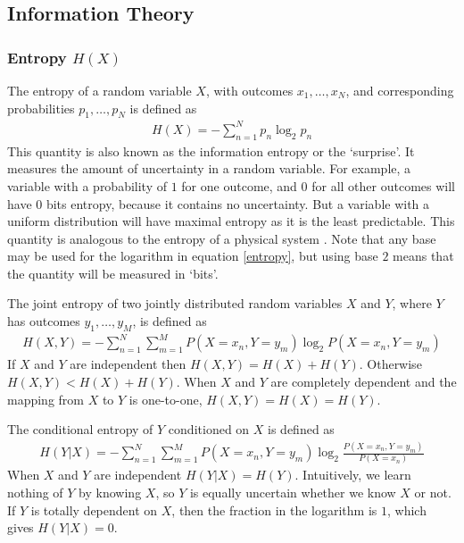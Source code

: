     \subsection{Information Theory}\label{sec:information_theory}
        \subsubsection{Entropy $H(X)$}
        The entropy of a random variable $X$, with outcomes $x_1, \dots, x_N$, and corresponding probabilities $p_1, \dots, p_N$ is defined as
        \begin{align}\label{entropy}
        H(X) = -\sum_{n=1}^N p_n \log _2 p_n
        \end{align}
        This quantity is also known as the information entropy or the `surprise'. It measures the amount of uncertainty in a random variable. For example, a variable with a probability of $1$ for one outcome, and $0$ for all other outcomes will have 0 bits entropy, because it contains no uncertainty. But a variable with a uniform distribution will have maximal entropy as it is the least predictable. This quantity is analogous to the entropy of a physical system  \parencite{shannon}. Note that any base may be used for the logarithm in equation \ref{entropy}, but using base $2$ means that the quantity will be measured in `bits'.

        The joint entropy of two jointly distributed random variables $X$ and $Y$, where $Y$ has outcomes $y_1, \dots, y_M$, is defined as
        \begin{align}\label{joint_entropy}
        H(X, Y) = -\sum_{n=1}^N \sum_{m=1}^M P(X=x_n, Y=y_m) \log _2 P(X=x_n, Y=y_m)
        \end{align}
        If $X$ and $Y$ are independent then $H(X,Y) = H(X) + H(Y)$. Otherwise $H(X,Y) < H(X) + H(Y)$. When $X$ and $Y$ are completely dependent and the mapping from $X$ to $Y$ is one-to-one, $H(X,Y) = H(X) = H(Y)$.

        The conditional entropy of $Y$ conditioned on $X$ is defined as
        \begin{align}
        H(Y|X) = -\sum_{n=1}^N \sum_{m=1}^M P(X=x_n, Y=y_m) \log _2 \frac{P(X=x_n, Y=y_m)}{P(X=x_n)}
        \end{align}
        When $X$ and $Y$ are independent $H(Y|X) = H(Y)$. Intuitively, we learn nothing of $Y$ by knowing $X$, so $Y$ is equally uncertain whether we know $X$ or not. If $Y$ is totally dependent on $X$, then the fraction in the logarithm is $1$, which gives $H(Y|X) = 0$.


